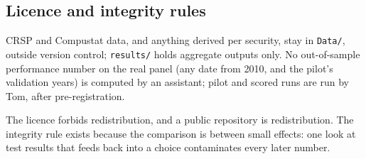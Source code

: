 \subsection{Licence and integrity rules}

CRSP and Compustat data, and anything derived per security, stay in \texttt{Data/}, outside version
control; \texttt{results/} holds aggregate outputs only. No out-of-sample performance number on the real
panel (any date from 2010, and the pilot's validation years) is computed by an assistant; pilot and
scored runs are run by Tom, after pre-registration.

\begin{whybox}
The licence forbids redistribution, and a public repository is redistribution. The integrity rule exists
because the comparison is between small effects: one look at test results that feeds back into a choice
contaminates every later number.
\end{whybox}
